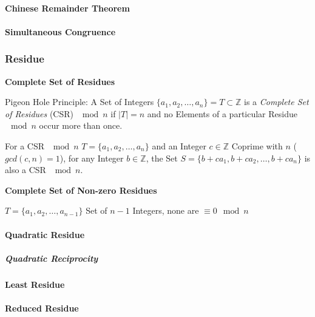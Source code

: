 \paragraph{Chinese Remainder Theorem}\label{sec:chinese_remainder}\hfill

\paragraph{Simultaneous Congruence}\label{sec:simultaneous_congruence}\hfill



\subsubsection{Residue}\label{sec:residue}

\textbf{Complete Set of Residues}

Pigeon Hole Principle: A Set of Integers $\{a_1, a_2, \ldots, a_n\} =
T \subset \mathbb{Z}$ is a \emph{Complete Set of Residues} (CSR)
$\mod n$ if $|T| = n$ and no Elements of a particular Residue
$\mod n$ occur more than once.

For a CSR $\mod n$ $T = \{a_1, a_2, \ldots, a_n\}$ and an
Integer $c \in \mathbb{Z}$ Coprime with $n$ ($gcd(c,n) = 1$), for any
Integer $b \in \mathbb{Z}$, the Set $S = \{b + ca_1, b + ca_2, \ldots,
b + ca_n \}$ is also a CSR $\mod n$.



\textbf{Complete Set of Non-zero Residues}

$T = \{ a_1, a_2, \ldots, a_{n-1} \}$ Set of $n-1$ Integers, none are
$\equiv 0 \mod n$



\paragraph{Quadratic Residue}\label{sec:quadratic_residue}\hfill

\subparagraph{Quadratic Reciprocity}\label{sec:quadratic_reciprocity}\hfill



\paragraph{Least Residue}\label{sec:least_residue}\hfill

\paragraph{Reduced Residue}\label{sec:reduced_residue}\hfill



